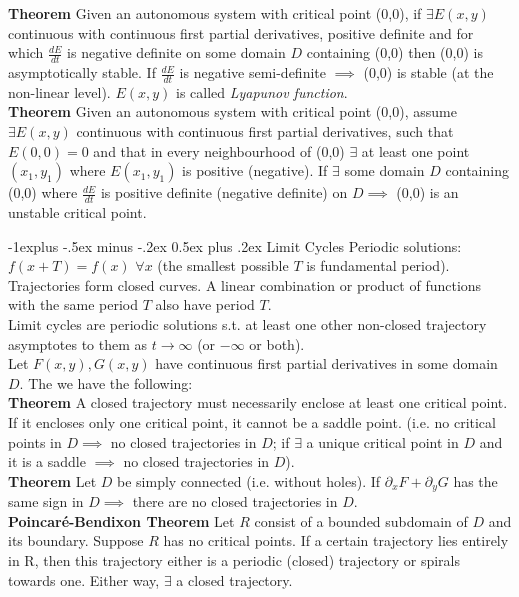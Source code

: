 \documentclass[10pt,landscape]{article}
\makeatletter
\renewcommand{\subsection}{\@startsection{subsection}{2}{0mm}%
                                {-1explus -.5ex minus -.2ex}%
                                {0.5ex plus .2ex}%
                                {\normalfont\normalsize\bfseries}}
\newcommand{\f}{\frac}
\makeatother
\begin{document}
\begin{multicols}{3}
  	\textbf{Theorem} Given an autonomous system with critical point (0,0), if $\exists E(x,y)$ continuous with continuous first partial derivatives, positive definite and for which $\f{dE}{dt}$ is negative definite on some domain $D$ containing (0,0) then (0,0) is asymptotically stable. If $\f{dE}{dt}$ is negative semi-definite $\implies$ (0,0) is stable (at the non-linear level). $E(x,y)$ is called \emph{Lyapunov function}. \\
  
   	\textbf{Theorem } Given an autonomous system with critical point (0,0), assume $\exists E(x,y)$ continuous with continuous first partial derivatives, such that $E(0,0) = 0$ and that in every neighbourhood of (0,0) $\exists$ at least one point $(x_1,y_1)$ where $E(x_1,y_1)$ is positive (negative). If $\exists$ some domain $D$ containing (0,0) where $\f{dE}{dt}$ is positive definite (negative definite) on $D \implies$ (0,0) is an unstable critical point.
    
    	\subsection{Limit Cycles}
	Periodic solutions: $f(x+T) = f(x)$ $\forall x$ (the smallest possible $T$ is fundamental period). Trajectories form closed curves. 
	A linear combination or product of functions with the same period $T$ also have period $T$. \\Limit cycles are periodic solutions s.t. at least one other non-closed trajectory asymptotes to them as $t\rightarrow  \infty$ (or $-\infty$ or both). \\
	Let $F(x,y), G(x,y)$ have continuous first partial derivatives in some domain $D$. The we have the following:\\
	
     	\textbf{Theorem}  A closed trajectory must necessarily enclose at least one critical point. If it encloses only one critical point, it cannot be a saddle point. (i.e. no critical points in $D \implies$ no closed trajectories in $D$; if $\exists$ a unique critical point in $D$ and it is a saddle $\implies$ no closed trajectories in $D$).\\
	
        \textbf{Theorem} Let $D$ be simply connected (i.e. without holes). If $\partial_xF + \partial_yG$ has the same sign in $D \implies$ there are no closed trajectories in $D$.\\
        
        \textbf{Poincar\'e-Bendixon Theorem} Let $R$ consist of a bounded subdomain of $D$ and its boundary. Suppose $R$ has no critical points. If a certain trajectory lies entirely in R, then this trajectory either is a periodic (closed) trajectory or spirals towards one. Either way,  $\exists$ a closed trajectory.
           

\end{multicols}
\end{document}
